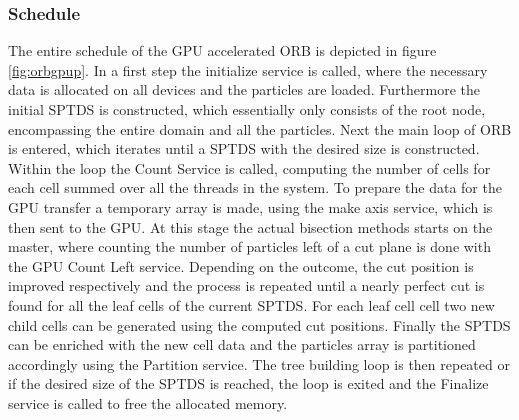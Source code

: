 \documentclass[]{article}
\begin{document}
\subsubsection{Schedule}

The entire schedule of the GPU accelerated ORB is depicted in figure \ref{fig:orbgpup}. In a first step the initialize service is called, where the necessary data is allocated on all devices and the particles are loaded. Furthermore the initial SPTDS is constructed, which essentially only consists of the root node, encompassing the entire domain and all the particles. Next the main loop of ORB is entered, which iterates until a SPTDS with the desired size is constructed. Within the loop the Count Service is called, computing the number of cells for each cell summed over all the threads in the system. To prepare the data for the GPU transfer a temporary array is made, using the make axis service, which is then sent to the GPU. 
At this stage the actual bisection methods starts on the master, where counting the number of particles left of a cut plane is done with the GPU Count Left service. Depending on the outcome, the cut position is improved respectively and the process is repeated until a nearly perfect cut is found for all the leaf cells of the current SPTDS. For each leaf cell cell two new child cells can be generated using the computed cut positions. Finally the SPTDS can be enriched with the new cell data and the particles array is partitioned accordingly using the Partition service. 
The tree building loop is then repeated or if the desired size of the SPTDS is reached, the loop is exited and the Finalize service is called to free the allocated memory.
\end{document}
